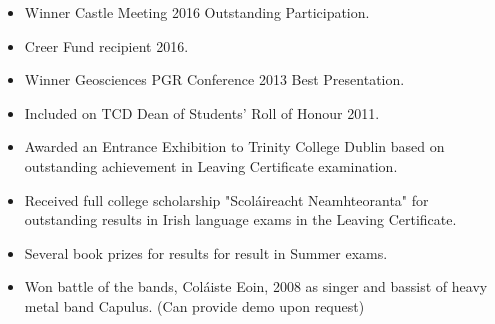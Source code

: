 \documentclass[11pt]{article}
\newenvironment{resumeSubSectionBody}{
    \par
    \vspace{-0.8\parskip}
    \begin{small}
    \par
} {
    \par
    \end{small}
    \par
}
\begin{document}
%
%
\begin{resumeSubSectionBody}

    \begin{itemize}
        \setlength\itemsep{0em}
        \setlength\parskip{0em}
        \item
            Winner Castle Meeting 2016 Outstanding Participation.

        \item
            Creer Fund recipient 2016.

        \item
            Winner Geosciences PGR Conference 2013 Best Presentation.

        \item
            Included on TCD Dean of Students' Roll of Honour 2011.

        \item
            Awarded an Entrance Exhibition to Trinity College Dublin
            based on outstanding achievement in Leaving Certificate
            examination.

        \item
            Received full college scholarship "Scol\'aireacht Neamhteoranta"
            for outstanding results in Irish language exams in the
            Leaving Certificate.

        \item
            Several book prizes for results for result in Summer exams.

        \item
            Won battle of the bands, Col\'aiste Eoin, 2008 as singer and bassist
            of heavy metal band Capulus. (Can provide demo upon request)

    \end{itemize}

\end{resumeSubSectionBody}


\end{document}
